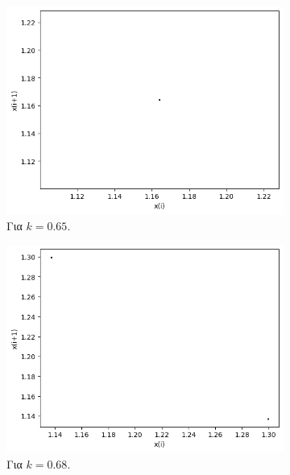 \begin{figure}[h!]
\begin{subfigure}[b]{0.4\textwidth}
		\includegraphics[width=\textwidth]{LateX images/graphs q14/g13}
		\caption{Για $k=0.65$.}
		\label{f:k70}
	\end{subfigure}
	\hfill
	\begin{subfigure}[b]{0.4\textwidth}
		\centering
		\includegraphics[width=\textwidth]{LateX images/graphs q14/g14}
		\caption{Για $k=0.68$.}
		\label{f:k71}
	\end{subfigure}
	\hfill
	\begin{subfigure}[b]{0.4\textwidth}
		\centering

\end{subfigure}
\end{figure}
